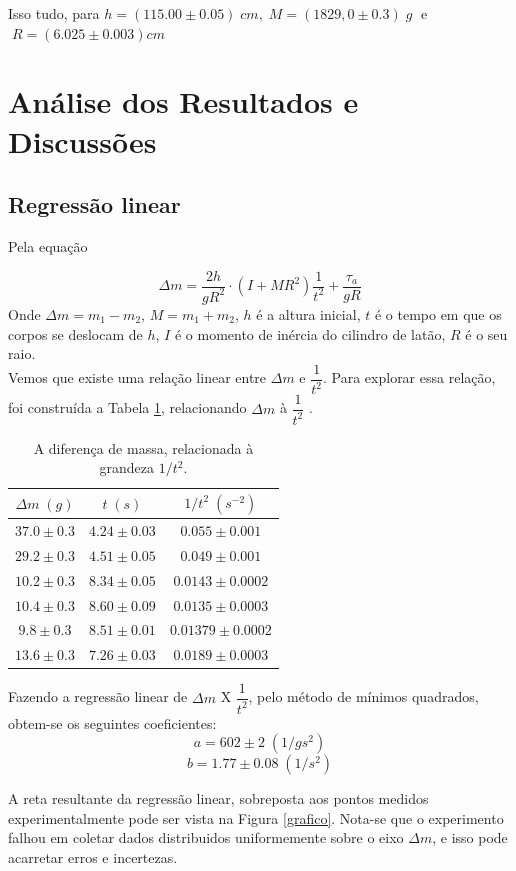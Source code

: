 \documentclass[12pt,a4paper]{article}
\begin{document}
Isso tudo, para $h = (115.00 \pm 0.05) \; cm, \; M = (1829,0 \pm 0.3) \; g \;$ e $\; R = (6.025 \pm 0.003) cm$

\section{Análise dos Resultados e Discussões}
\subsection{Regressão linear}
Pela equação 

$$\Delta m = \frac{2h}{gR^2} \cdot (I + MR^2)\dfrac{1}{t^2}  + \frac{\tau _a} {gR}$$
Onde $\Delta m = m_1 - m_2$, $ M = m_1 + m_2 $, $h$ é a altura inicial, $t$ é o tempo em que os corpos se deslocam de $h$, $I$ é o momento de inércia do cilindro de latão, $R$ é o seu raio.\\
Vemos que existe uma relação linear entre $\Delta m$ e $ \dfrac{1}{t^2}$. Para explorar essa relação, foi construída a Tabela \ref{linear}, relacionando $\Delta m$ à $ \dfrac{1}{t^2} $ .

\begin{table}[!htbp]
\centering
\def\arraystretch{1.5}
\caption{A diferença de massa, relacionada à grandeza $1/t^2$.}
\begin{tabular}{|c|c|c|}
\hline 
$\Delta m \; (g)$ & $t \; (s)$ & $1/t^2 \; (s^{-2})$ \\ 
\hline 
$37.0 \pm 0.3$ & $4.24 \pm 0.03 $ & $0.055 \pm 0.001 $  \\
\hline
$29.2 \pm 0.3$ & $4.51 \pm 0.05 $ & $0.049 \pm 0.001$ \\
\hline
$10.2 \pm 0.3$ & $8.34 \pm 0.05 $ & $0.0143 \pm 0.0002$\\
\hline
$10.4 \pm 0.3$ & $8.60 \pm 0.09 $ & $ 0.0135 \pm 0.0003 $\\
\hline
$9.8 \pm 0.3$ & $8.51 \pm 0.01 $ & $ 0.01379 \pm 0.0002 $\\
\hline
$13.6 \pm 0.3$ & $7.26 \pm 0.03 $ & $ 0.0189 \pm 0.0003 $ \\
\hline
\end{tabular} 
\label{linear}
\end{table}
Fazendo a regressão linear de $ \Delta m$ X $ \dfrac{1}{t^2} $, pelo método de mínimos quadrados, obtem-se os seguintes coeficientes: 
	$$ a = 602 \pm 2 \; (1/gs^2)$$
	$$ b = 1.77 \pm 0.08 \; (1/s^2)$$

A reta resultante da regressão linear, sobreposta aos pontos medidos experimentalmente pode ser vista na Figura \ref{grafico}. Nota-se que o experimento falhou em coletar dados distribuidos uniformemente sobre o eixo $ \Delta m$, e isso pode acarretar erros e incertezas.
\end{document}
